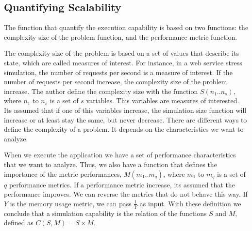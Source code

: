 \subsection{Quantifying Scalability}

The function that quantify the execution capability is based on two functions: the complexity size of the problem function, and the performance metric function. 

The complexity size of the problem is based on a set of values that describe its state, which are called measures of interest. For instance, in a web service stress simulation, the number of requests per second is a measure of interest. If the number of requests per second increase, the complexity size of the problem increase. The author define the complexity size with the function $S(n_{1}..n_{s})$, where $n_{1}$ to $n_{s}$ is a set of $s$ variables. This variables are measures of interested. Its assumed that if one of this variables increase, the simulation size function will increase or at least stay the same, but never decrease. There are different ways to define the complexity of a problem. It depends on the characteristics we want to analyze.



When we execute the application we have a set of performance characteristics that we want to analyze. Thus, we also have a function that defines the importance of the metric performances, $M(m_{1}..m_{q})$, where $m_{1}$ to $m_{q}$ is a set of $q$ performance metrics. If a performance metric increase, its assumed that the performance improves. We can reverse the metrics that do not behave this way. If $Y$ is the memory usage metric, we can pass $\frac{1}{Y}$ as input. With these definition we conclude that a simulation capability is the relation of the functions $S$ and $M$, defined as $C(S,M) = S \times M$.

